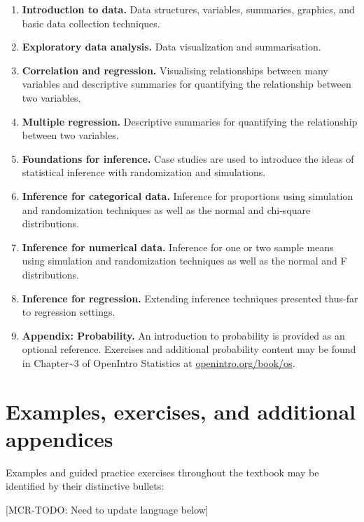 \documentclass[]{book}
\providecommand{\tightlist}{%
  \setlength{\itemsep}{0pt}\setlength{\parskip}{0pt}}
\begin{document}
\begin{enumerate}
\def\labelenumi{\arabic{enumi}.}
\tightlist
\item
  \textbf{Introduction to data.} Data structures, variables, summaries, graphics, and basic data collection techniques.
\item
  \textbf{Exploratory data analysis.} Data visualization and summarisation.
\item
  \textbf{Correlation and regression.} Visualising relationships between many variables and descriptive summaries for quantifying the relationship between two variables.
\item
  \textbf{Multiple regression.} Descriptive summaries for quantifying the relationship between two variables.
\item
  \textbf{Foundations for inference.} Case studies are used to introduce the ideas of statistical inference with randomization and simulations.
\item
  \textbf{Inference for categorical data.} Inference for proportions using simulation and randomization techniques as well as the normal and chi-square distributions.
\item
  \textbf{Inference for numerical data.} Inference for one or two sample means using simulation and randomization techniques as well as the normal and F distributions.
\item
  \textbf{Inference for regression.} Extending inference techniques presented thus-far to regression settings.
\item
  \textbf{Appendix: Probability.} An introduction to probability is provided as an optional reference. Exercises and additional probability content may be found in Chapter\textasciitilde{}3 of OpenIntro Statistics at \href{https://www.openintro.org/book/os/}{openintro.org/book/os}.
\end{enumerate}

\hypertarget{examples-exercises-and-additional-appendices}{%
\section*{Examples, exercises, and additional appendices}\label{examples-exercises-and-additional-appendices}}

Examples and guided practice exercises throughout the textbook may be identified by their distinctive bullets:

{[}MCR-TODO: Need to update language below{]}
\end{document}
